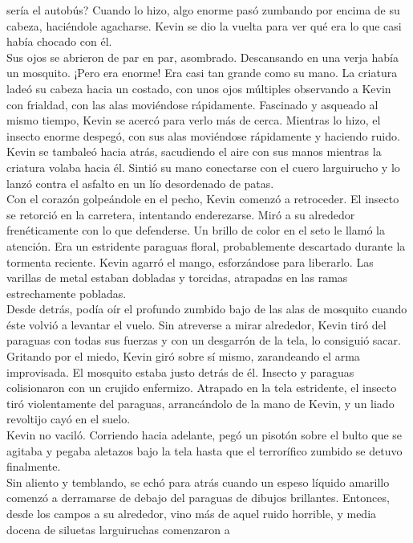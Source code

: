 sería el autobús? Cuando lo hizo, algo enorme pasó zumbando por encima
de su cabeza, haciéndole agacharse. Kevin se dio la vuelta para ver qué
era lo que casi había chocado con él.\\
Sus ojos se abrieron de par en par, asombrado. Descansando en una verja
había un mosquito. ¡Pero era enorme! Era casi tan grande como su mano.
La criatura ladeó su cabeza hacia un costado, con unos ojos múltiples
observando a Kevin con frialdad, con las alas moviéndose rápidamente.
Fascinado y asqueado al mismo tiempo, Kevin se acercó para verlo más de
cerca. Mientras lo hizo, el insecto enorme despegó, con sus alas
moviéndose rápidamente y haciendo ruido.\\
Kevin se tambaleó hacia atrás, sacudiendo el aire con sus manos mientras
la criatura volaba hacia él. Sintió su mano conectarse con el cuero
larguirucho y lo lanzó contra el asfalto en un lío desordenado de
patas.\\
Con el corazón golpeándole en el pecho, Kevin comenzó a retroceder. El
insecto se retorció en la carretera, intentando enderezarse. Miró a su
alrededor frenéticamente con lo que defenderse. Un brillo de color en el
seto le llamó la atención. Era un estridente paraguas floral,
probablemente descartado durante la tormenta reciente. Kevin agarró el
mango, esforzándose para liberarlo. Las varillas de metal estaban
dobladas y torcidas, atrapadas en las ramas estrechamente pobladas.\\
Desde detrás, podía oír el profundo zumbido bajo de las alas de mosquito
cuando éste volvió a levantar el vuelo. Sin atreverse a mirar alrededor,
Kevin tiró del paraguas con todas sus fuerzas y con un desgarrón de la
tela, lo consiguió sacar.\\
Gritando por el miedo, Kevin giró sobre sí mismo, zarandeando el arma
improvisada. El mosquito estaba justo detrás de él. Insecto y paraguas
colisionaron con un crujido enfermizo. Atrapado en la tela estridente,
el insecto tiró violentamente del paraguas, arrancándolo de la mano de
Kevin, y un liado revoltijo cayó en el suelo.\\
Kevin no vaciló. Corriendo hacia adelante, pegó un pisotón sobre el
bulto que se agitaba y pegaba aletazos bajo la tela hasta que el
terrorífico zumbido se detuvo finalmente.\\
Sin aliento y temblando, se echó para atrás cuando un espeso líquido
amarillo comenzó a derramarse de debajo del paraguas de dibujos
brillantes. Entonces, desde los campos a su alrededor, vino más de aquel
ruido horrible, y media docena de siluetas larguiruchas comenzaron a
